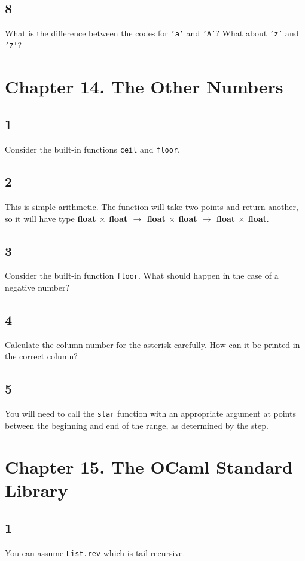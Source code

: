 \documentclass[]{book}
\begin{document}
\subsection*{8}
What is the difference between the codes for \texttt{'a'} and \texttt{'A'}? What about \texttt{'z'} and \texttt{'Z'}?

\section*{Chapter 14. The Other Numbers}
\subsection*{1}
Consider the built-in functions \texttt{ceil} and \texttt{floor}. 

\subsection*{2}
This is simple arithmetic. The function will take two points and return another, so it will have type \textbf{\textsf{float $\times$ float $\rightarrow$ float $\times$ float $\rightarrow$ float $\times$ float}}.

\subsection*{3}
Consider the built-in function \texttt{floor}. What should happen in the case of a negative number?

\subsection*{4}
Calculate the column number for the asterisk carefully. How can it be printed in the correct column?

\subsection*{5}
You will need to call the \texttt{star} function with an appropriate argument at points between the beginning and end of the range, as determined by the step.

\section*{Chapter 15. The OCaml Standard Library}
\subsection*{1}You can assume \texttt{List.rev} which is tail-recursive.
\end{document}

